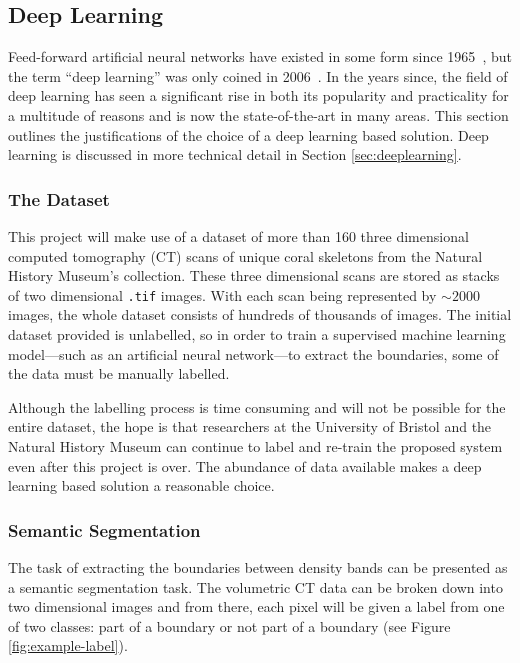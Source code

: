 \subsection{Deep Learning}
\label{sec:contextdl}

Feed-forward artificial neural networks have existed in some form since 1965~\cite{deepoverview, 1966cybernetic}, but the term ``deep learning'' was only coined in 2006~\cite{deepoverview, hintondeep, hintonfast}. In the years since, the field of deep learning has seen a significant rise in both its popularity and practicality for a multitude of reasons and is now the state-of-the-art in many areas. This section outlines the justifications of the choice of a deep learning based solution. Deep learning is discussed in more technical detail in Section \ref{sec:deeplearning}.

\subsubsection{The Dataset}

This project will make use of a dataset of more than 160 three dimensional computed tomography (CT) scans of unique coral skeletons from the Natural History Museum's collection. These three dimensional scans are stored as stacks of two dimensional \texttt{.tif} images. With each scan being represented by ${\sim}2000$ images, the whole dataset consists of hundreds of thousands of images. The initial dataset provided is unlabelled, so in order to train a supervised machine learning model---such as an artificial neural network---to extract the boundaries, some of the data must be manually labelled.

Although the labelling process is time consuming and will not be possible for the entire dataset, the hope is that researchers at the University of Bristol and the Natural History Museum can continue to label and re-train the proposed system even after this project is over. The abundance of data available makes a deep learning based solution a reasonable choice.

\subsubsection{Semantic Segmentation}
\label{sec:semseg}

The task of extracting the boundaries between density bands can be presented as a semantic segmentation task. The volumetric CT data can be broken down into two dimensional images and from there, each pixel will be given a label from one of two classes: part of a boundary or not part of a boundary (see Figure \ref{fig:example-label}).

